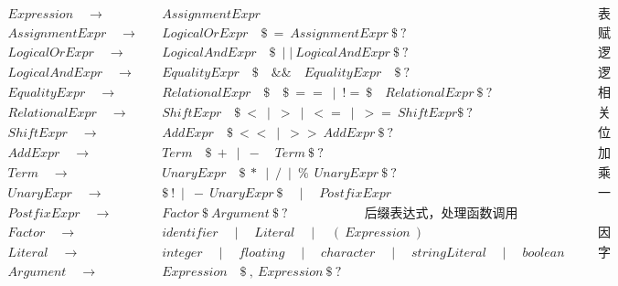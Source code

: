 \documentclass[11pt]{article}
\begin{document}
    \begin{align*}
        Expression \quad \to&\quad AssignmentExpr &\quad &\textit{表达式入口} \\
        AssignmentExpr \quad \to&\quad LogicalOrExpr\quad\$\ =\ AssignmentExpr\ \$\ ?&\quad &\textit{赋值表达式} \\
        LogicalOrExpr \quad \to&\quad LogicalAndExpr\quad\$\ \mid\mid\ LogicalAndExpr\ \$\ ?&\quad &\textit{逻辑或表达式} \\
        LogicalAndExpr \quad \to&\quad EqualityExpr\quad\$\quad\&\&\quad EqualityExpr\quad \$\ ?&\quad &\textit{逻辑与表达式} \\
        EqualityExpr \quad \to&\quad RelationalExpr\quad\$\quad\$\ ==\ \mid\ !=\ \$\quad RelationalExpr\ \$\ ?&\quad &\textit{相等性表达式} \\
        RelationalExpr \quad \to&\quad ShiftExpr\quad\$\ <\ \mid\ >\ \mid\ <=\ \mid\ >=\ ShiftExpr\$\ ?&\quad &\textit{关系表达式} \\
        ShiftExpr \quad \to&\quad AddExpr\quad \$\ <<\ \mid\ >>\ AddExpr\ \$\ ?&\quad &\textit{位移表达式} \\
        AddExpr \quad \to&\quad Term\quad\$\ +\ \mid\ -\quad Term\ \$\ ?&\quad &\textit{加减法表达式} \\
        Term \quad \to&\quad UnaryExpr\quad\$\ *\ \mid\ /\ \mid\ \%\ \ UnaryExpr\ \$\ ?&\quad &\textit{乘除法表达式} \\
        UnaryExpr \quad \to&\quad \$\ !\ \mid\ -\ UnaryExpr\ \$\quad \mid\quad PostfixExpr\ &\quad &\textit{一元表达式} \\
        PostfixExpr \quad \to&\quad Factor\ \$\ Argument\ \$\ ?\quad\hspace{5em} \textit{后缀表达式，处理函数调用} \\
        Factor \quad \to&\quad identifier\quad \mid\quad Literal\quad \mid\quad (\ Expression\ )&\quad &\textit{因子} \\
        Literal \quad \to&\quad integer\quad \mid\quad floating\quad \mid\quad character\quad \mid\quad stringLiteral\quad \mid\quad boolean &\quad &\textit{字面量} \\
        Argument \quad \to&\quad Expression\quad \$\ ,\ Expression\ \$\ ?
    \end{align*}
\end{document}
